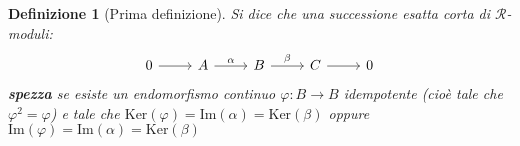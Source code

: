 \documentclass[10pt, twoside=false, x11names]{scrbook}
\newtheorem{definition}[theorem]{Definizione}
\newcommand{\R}{\mathcal{R}}
\newcommand{\im}[1]{\mathrm{Im}( #1 )}
\renewcommand{\ker}[1]{\mathrm{Ker}( #1)}
\newcommand*\quot[2]{{^{\textstyle #1}\big/_{\textstyle #2}}}
\let\phi\varphi
\begin{document}

\begin{definition}[Prima definizione]
  Si dice che una successione esatta corta di $ \R $-moduli:
  \[
    \begin{tikzcd}
      0 \arrow{r}{} & A \arrow{r}{\alpha} & B \arrow{r}{\beta} & C \arrow{r}{} & 0
    \end{tikzcd}
  \]\textbf{spezza} se esiste un endomorfismo continuo
  $ \phi \colon B \to B $ idempotente (cioè tale che $ \phi^2 = \phi $) e tale che $ \ker{\phi} = \im{\alpha} = \ker{\beta} $
  oppure $ \im{\phi} = \im{\alpha} = \ker{\beta} $
\end{definition}

\end{document}
